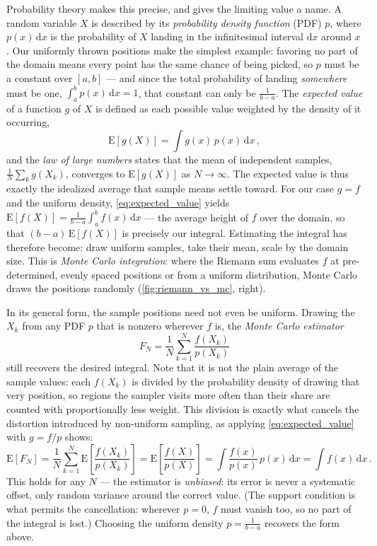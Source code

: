 Probability theory makes this precise, and gives the limiting value a name. A random variable $X$ is described by its \emph{probability density function} (PDF) $p$, where $p(x)\,\mathrm{d}x$ is the probability of $X$ landing in the infinitesimal interval $\mathrm{d}x$ around $x$. Our uniformly thrown positions make the simplest example: favoring no part of the domain means every point has the same chance of being picked, so $p$ must be a constant over $[a,b]$ --- and since the total probability of landing \emph{somewhere} must be one, $\int_a^b p(x) \,\mathrm{d}x = 1$, that constant can only be $\frac{1}{b-a}$. The \emph{expected value} of a function $g$ of $X$ is defined as each possible value weighted by the density of it occurring,
\begin{equation}
	\label{eq:expected_value}
	\mathrm{E}[g(X)] = \int g(x) \, p(x) \,\mathrm{d}x \,,
\end{equation}
and the \emph{law of large numbers} states that the mean of independent samples, $\frac{1}{N}\sum_k g(X_k)$, converges to $\mathrm{E}[g(X)]$ as $N \to \infty$. The expected value is thus exactly the idealized average that sample means settle toward. For our case $g = f$ and the uniform density, \cref{eq:expected_value} yields $\mathrm{E}[f(X)] = \frac{1}{b-a}\int_a^b f(x)\,\mathrm{d}x$ --- the average height of $f$ over the domain, so that $(b-a) \, \mathrm{E}[f(X)]$ is precisely our integral. Estimating the integral has therefore become: draw uniform samples, take their mean, scale by the domain size. This is \emph{Monte Carlo integration}: where the Riemann sum evaluates $f$ at pre-determined, evenly spaced positions or from a uniform distribution, Monte Carlo draws the positions randomly (\cref{fig:riemann_vs_mc}, right).

In its general form, the sample positions need not even be uniform. Drawing the $X_k$ from any PDF $p$ that is nonzero wherever $f$ is, the \emph{Monte Carlo estimator}
\begin{equation}
	\label{eq:mc_estimator}
	F_N = \frac{1}{N} \sum_{k=1}^{N} \frac{f(X_k)}{p(X_k)}
\end{equation}
still recovers the desired integral. Note that it is not the plain average of the sample values: each $f(X_k)$ is divided by the probability density of drawing that very position, so regions the sampler visits more often than their share are counted with proportionally less weight. This division is exactly what cancels the distortion introduced by non-uniform sampling, as applying \cref{eq:expected_value} with $g = f/p$ shows:
\begin{equation*}
	\mathrm{E}[F_N]
	= \frac{1}{N} \sum_{k=1}^{N} \mathrm{E}\!\left[\frac{f(X_k)}{p(X_k)}\right]
	= \mathrm{E}\!\left[\frac{f(X)}{p(X)}\right]
	= \int \frac{f(x)}{p(x)} \, p(x) \,\mathrm{d}x
	= \int f(x) \,\mathrm{d}x \,.
\end{equation*}
This holds for any $N$ --- the estimator is \emph{unbiased}: its error is never a systematic offset, only random variance around the correct value. (The support condition is what permits the cancellation: wherever $p = 0$, $f$ must vanish too, so no part of the integral is lost.) Choosing the uniform density $p = \frac{1}{b-a}$ recovers the form above.


